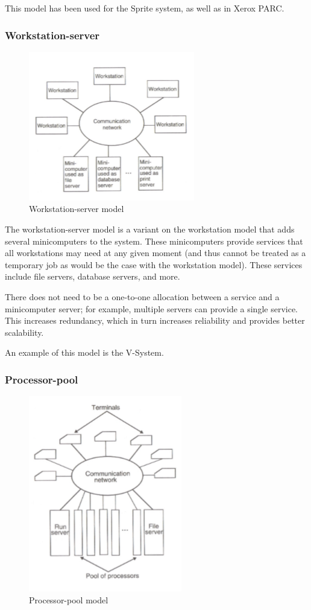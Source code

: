 This model has been used for the Sprite system, as well as in Xerox PARC.

\subsubsection{Workstation-server}
\begin{figure}
\centering
\includegraphics[width=0.5\linewidth]{figures/screenshot005}
\caption{Workstation-server model}
\label{fig:screenshot005}
\end{figure}

The workstation-server model is a variant on the workstation model that adds several minicomputers to the system. These minicomputers provide services that all workstations may need at any given moment (and thus cannot be treated as a temporary job as would be the case with the workstation model). These services include file servers, database servers, and more.

There does not need to be a one-to-one allocation between a service and a minicomputer server; for example, multiple servers can provide a single service. This increases redundancy, which in turn increases reliability and provides better scalability.

An example of this model is the V-System.

\subsubsection{Processor-pool}
\begin{figure}[h]
\centering
\includegraphics[width=0.5\linewidth]{figures/screenshot006}
\caption{Processor-pool model}
\label{fig:screenshot006}
\end{figure}

